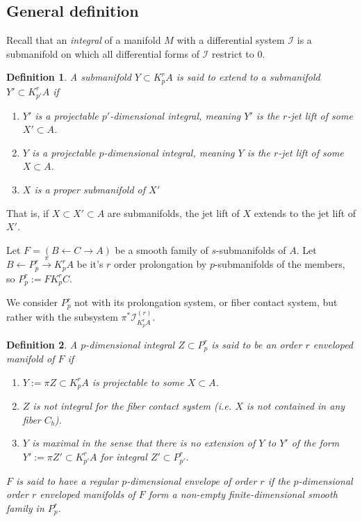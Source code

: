 \documentclass[12pt]{article}
\numberwithin{equation}{section}
\theoremstyle{plain}
\newtheorem{definition}{Definition}[section]
\theoremstyle{definition}
\newcommand{\la}{\leftarrow}
\newcommand{\ra}{\rightarrow}
\begin{document}
\subsection{General definition}

Recall that an \emph{integral} of a manifold $M$ with a differential system $\mathcal{I}$ is a submanifold on which all differential forms of $\mathcal{I}$ restrict to $0$.

\begin{definition}
A submanifold $Y\subset K^{r}_{p}A$ is said to \emph{extend} to a submanifold $Y'\subset K^{r}_{p'}A$ if
\begin{enumerate}
\itemsep0em
\item{$Y'$ is a projectable $p'$-dimensional integral, meaning $Y'$ is the $r$-jet lift of some $X'\subset A$.}
\item{$Y$ is a projectable $p$-dimensional integral, meaning $Y$ is the $r$-jet lift of some $X\subset A$.}
\item{$X$ is a proper submanifold of $X'$}
\end{enumerate}
\end{definition}

That is, if $X\subset X'\subset A$ are submanifolds, the jet lift of $X$ extends to the jet lift of $X'$.

Let $F=(B\la C\ra A)$ be a smooth family of $s$-submanifolds of $A$. Let $B\la P^{r}_{p}\overset{\pi}{\ra} K^{r}_{p}A$ be it's $r$ order prolongation by $p$-submanifolds of the members, so $P^{r}_{p}:=FK^{r}_{p}C$.

We consider $P^{r}_{p}$ not with its prolongation system, or fiber contact system, but rather with the subsystem $\pi^{*}\mathcal{I}^{(r)}_{K^{r}_{p}A}$.

\begin{definition}\label{envDef} A $p$-dimensional integral $Z\subset P^{r}_{p}$ is said to be \emph{an order $r$ enveloped manifold} of $F$ if
\begin{enumerate}
\itemsep0em
\item{\label{projX}$Y:=\pi Z\subset K^{r}_{p}A$ is projectable to some $X\subset A$.}
\item{$Z$ is not integral for the fiber contact system (i.e. $X$ is not contained in any fiber $C_b$).}
\item{$Y$ is maximal in the sense that there is no extension of $Y$ to $Y'$ of the form $Y':=\pi Z'\subset K^{r}_{p'}A$ for integral $Z'\subset P^{r}_{p'}$.}
\end{enumerate}

$F$ is said to have a \emph{regular $p$-dimensional envelope of order $r$} if the $p$-dimensional order $r$ enveloped manifolds of $F$ form a non-empty finite-dimensional smooth family in $P^{r}_{p}$.
\end{definition}
\end{document}
